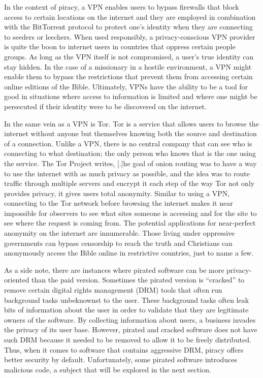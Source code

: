 \documentclass[onecolumn, 12pt]{article}
\begin{document}
\begin{refsection}
In the context of piracy, a VPN enables users to bypass firewalls that block access to
certain locations on the internet and they are employed in combination with the BitTorrent
protocol to protect one's identity when they are connecting to seeders or leechers. When
used responsibly, a privacy-conscious VPN provider is quite the boon to internet users in
countries that oppress certain people groups. As long as the VPN itself is not
compromised, a user's true identity can stay hidden. In the case of a missionary in a
hostile environment, a VPN might enable them to bypass the restrictions that prevent them
from accessing certain online editions of the Bible. Ultimately, VPNs have the ability to
be a tool for good in situations where access to information is limited and where one
might be persecuted if their identity were to be discovered on the internet.

In the same vein as a VPN is Tor. Tor is a service that allows users to browse the
internet without anyone but themselves knowing both the source and destination of a
connection. Unlike a VPN, there is no central company that can see who is connecting to
what destination; the only person who knows that is the one using the service. The Tor
Project writes, [.]{he goal of onion routing was to have
a way to use the internet with as much privacy as possible, and the idea was to route
traffic through multiple servers and encrypt it each step of the way} Tor not only
provides privacy, it gives users total anonymity. Similar to using a VPN, connecting to
the Tor network before browsing the internet makes it near impossible for observers to see
what sites someone is accessing and for the site to see where the request is coming from.
The potential applications for near-perfect anonymity on the internet are innumerable.
Those living under oppressive governments can bypass censorship to reach the truth and
Christians can anonymously access the Bible online in restrictive countries, just to name
a few.

As a side note, there are instances where pirated software can be more privacy-oriented
than the paid version. Sometimes the pirated version is ``cracked'' to remove certain
digital rights management (DRM) tools that often run background tasks unbeknownst to the
user. These background tasks often leak bits of information about the user in order to
validate that they are legitimate owners of the software. By collecting information about
users, a business invades the privacy of its user base. However, pirated and cracked
software does not have such DRM because it needed to be removed to allow it to be freely
distributed. Thus, when it comes to software that contains aggressive DRM, piracy offers
better security by default. Unfortunately, some pirated software introduces malicious
code, a subject that will be explored in the next section.


\end{refsection}
\end{document}
